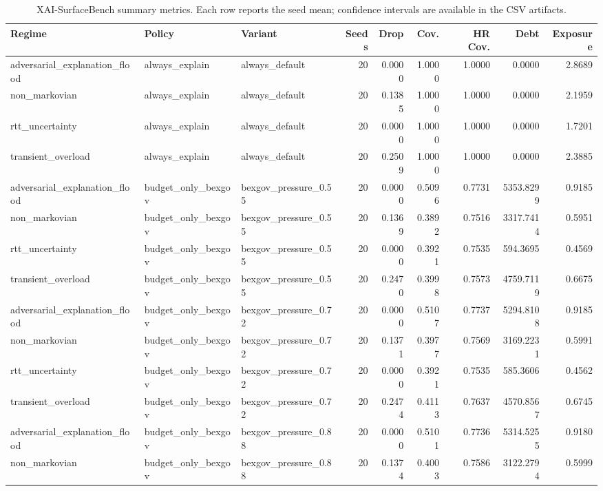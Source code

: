 \begin{table}[t]
\centering
\scriptsize
\caption{XAI-SurfaceBench summary metrics. Each row reports the seed mean; confidence intervals are available in the CSV artifacts.}
\begin{tabular}{lllrrrrrr}
\toprule
Regime & Policy & Variant & Seeds & Drop & Cov. & HR Cov. & Debt & Exposure \\
\midrule
adversarial\_explanation\_flood & always\_explain & always\_default & 20 & 0.0000 & 1.0000 & 1.0000 & 0.0000 & 2.8689 \\
non\_markovian & always\_explain & always\_default & 20 & 0.1385 & 1.0000 & 1.0000 & 0.0000 & 2.1959 \\
rtt\_uncertainty & always\_explain & always\_default & 20 & 0.0000 & 1.0000 & 1.0000 & 0.0000 & 1.7201 \\
transient\_overload & always\_explain & always\_default & 20 & 0.2509 & 1.0000 & 1.0000 & 0.0000 & 2.3885 \\
adversarial\_explanation\_flood & budget\_only\_bexgov & bexgov\_pressure\_0.55 & 20 & 0.0000 & 0.5096 & 0.7731 & 5353.8299 & 0.9185 \\
non\_markovian & budget\_only\_bexgov & bexgov\_pressure\_0.55 & 20 & 0.1369 & 0.3892 & 0.7516 & 3317.7414 & 0.5951 \\
rtt\_uncertainty & budget\_only\_bexgov & bexgov\_pressure\_0.55 & 20 & 0.0000 & 0.3921 & 0.7535 & 594.3695 & 0.4569 \\
transient\_overload & budget\_only\_bexgov & bexgov\_pressure\_0.55 & 20 & 0.2470 & 0.3998 & 0.7573 & 4759.7119 & 0.6675 \\
adversarial\_explanation\_flood & budget\_only\_bexgov & bexgov\_pressure\_0.72 & 20 & 0.0000 & 0.5107 & 0.7737 & 5294.8108 & 0.9185 \\
non\_markovian & budget\_only\_bexgov & bexgov\_pressure\_0.72 & 20 & 0.1371 & 0.3977 & 0.7569 & 3169.2231 & 0.5991 \\
rtt\_uncertainty & budget\_only\_bexgov & bexgov\_pressure\_0.72 & 20 & 0.0000 & 0.3921 & 0.7535 & 585.3606 & 0.4562 \\
transient\_overload & budget\_only\_bexgov & bexgov\_pressure\_0.72 & 20 & 0.2474 & 0.4113 & 0.7637 & 4570.8567 & 0.6745 \\
adversarial\_explanation\_flood & budget\_only\_bexgov & bexgov\_pressure\_0.88 & 20 & 0.0000 & 0.5101 & 0.7736 & 5314.5255 & 0.9180 \\
non\_markovian & budget\_only\_bexgov & bexgov\_pressure\_0.88 & 20 & 0.1374 & 0.4003 & 0.7586 & 3122.2794 & 0.5999 \\

\end{tabular}
\end{table}
